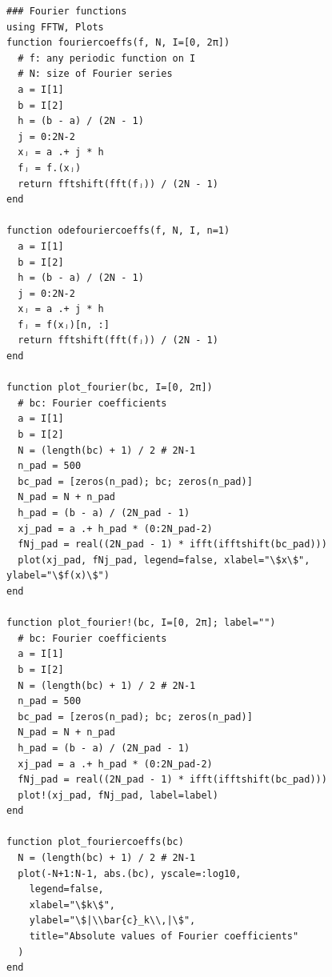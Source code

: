 \documentclass[11pt,a4paper,titlepage]{jsreport}
\theoremstyle{definition}
\begin{document}
\begin{lstlisting}[caption=FourierChebyshev.jl]
### Fourier functions
using FFTW, Plots
function fouriercoeffs(f, N, I=[0, 2π])
  # f: any periodic function on I
  # N: size of Fourier series
  a = I[1]
  b = I[2]
  h = (b - a) / (2N - 1)
  j = 0:2N-2
  xⱼ = a .+ j * h
  fⱼ = f.(xⱼ)
  return fftshift(fft(fⱼ)) / (2N - 1)
end

function odefouriercoeffs(f, N, I, n=1)
  a = I[1]
  b = I[2]
  h = (b - a) / (2N - 1)
  j = 0:2N-2
  xⱼ = a .+ j * h
  fⱼ = f(xⱼ)[n, :]
  return fftshift(fft(fⱼ)) / (2N - 1)
end

function plot_fourier(bc, I=[0, 2π])
  # bc: Fourier coefficients
  a = I[1]
  b = I[2]
  N = (length(bc) + 1) / 2 # 2N-1
  n_pad = 500
  bc_pad = [zeros(n_pad); bc; zeros(n_pad)]
  N_pad = N + n_pad
  h_pad = (b - a) / (2N_pad - 1)
  xj_pad = a .+ h_pad * (0:2N_pad-2)
  fNj_pad = real((2N_pad - 1) * ifft(ifftshift(bc_pad)))
  plot(xj_pad, fNj_pad, legend=false, xlabel="\$x\$", ylabel="\$f(x)\$")
end

function plot_fourier!(bc, I=[0, 2π]; label="")
  # bc: Fourier coefficients
  a = I[1]
  b = I[2]
  N = (length(bc) + 1) / 2 # 2N-1
  n_pad = 500
  bc_pad = [zeros(n_pad); bc; zeros(n_pad)]
  N_pad = N + n_pad
  h_pad = (b - a) / (2N_pad - 1)
  xj_pad = a .+ h_pad * (0:2N_pad-2)
  fNj_pad = real((2N_pad - 1) * ifft(ifftshift(bc_pad)))
  plot!(xj_pad, fNj_pad, label=label)
end

function plot_fouriercoeffs(bc)
  N = (length(bc) + 1) / 2 # 2N-1
  plot(-N+1:N-1, abs.(bc), yscale=:log10,
    legend=false,
    xlabel="\$k\$",
    ylabel="\$|\\bar{c}_k\\,|\$",
    title="Absolute values of Fourier coefficients"
  )
end


\end{lstlisting}
\end{document}

